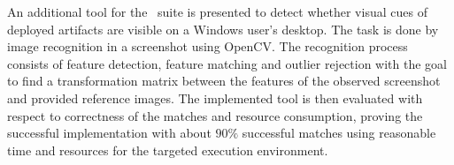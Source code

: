 An additional tool for the \ape~suite is presented to detect whether visual cues of deployed artifacts are visible on a Windows user's desktop. The task is done by image recognition in a screenshot using OpenCV. The recognition process consists of feature detection, feature matching and outlier rejection with the goal to find a transformation matrix between the features of the observed screenshot and provided reference images. The implemented tool is then evaluated with respect to correctness of the matches and resource consumption, proving the successful implementation with about $90\%$ successful matches using reasonable time and resources for the targeted execution environment.